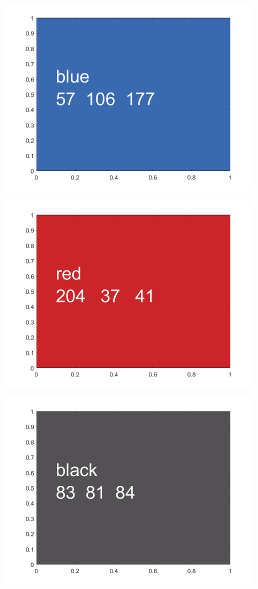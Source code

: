 \documentclass[
]{book}
\begin{document}
\includegraphics[width=5.20833in,height=\textheight]{img/fs_color_images/figure_0.png}

\includegraphics[width=5.20833in,height=\textheight]{img/fs_color_images/figure_1.png}

\includegraphics[width=5.20833in,height=\textheight]{img/fs_color_images/figure_2.png}
\end{document}
